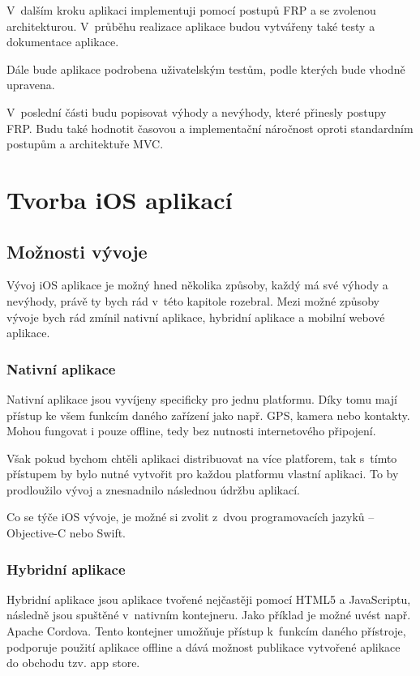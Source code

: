 \documentclass[thesis=M,czech]{FITthesis}[2012/06/26]
\begin{document}
V~dalším kroku aplikaci implementuji pomocí postupů FRP a se zvolenou architekturou. V~průběhu realizace aplikace budou vytvářeny také testy a dokumentace aplikace.

Dále bude aplikace podrobena uživatelským testům, podle kterých bude vhodně upravena.

V~poslední části budu popisovat výhody a nevýhody, které přinesly postupy FRP. Budu také hodnotit časovou a implementační náročnost oproti standardním postupům a architektuře MVC. 


\chapter{Tvorba iOS aplikací}

\section{Možnosti vývoje}
Vývoj iOS aplikace je možný hned několika způsoby, každý má své výhody a nevýhody, právě ty bych rád v~této kapitole rozebral. Mezi možné způsoby vývoje bych rád zmínil nativní aplikace, hybridní aplikace a mobilní webové aplikace.

\subsection{Nativní aplikace}
Nativní aplikace jsou vyvíjeny specificky pro jednu platformu. Díky tomu mají přístup ke všem funkcím daného zařízení jako např. GPS, kamera nebo kontakty. Mohou fungovat i pouze offline, tedy bez nutnosti internetového připojení. \cite{Nielsen}

Však pokud bychom chtěli aplikaci distribuovat na více platforem, tak s~tímto přístupem by bylo nutné vytvořit pro každou platformu vlastní aplikaci. To by prodloužilo vývoj a znesnadnilo následnou údržbu aplikací.

Co se týče iOS vývoje, je možné si zvolit z~dvou programovacích jazyků -- Objective-C nebo Swift. \cite{objc} \cite{swift}

\subsection{Hybridní aplikace}
Hybridní aplikace jsou aplikace tvořené nejčastěji pomocí HTML5 a JavaScriptu, následně jsou spuštěné v~nativním kontejneru. \cite{saleforce} Jako příklad je možné uvést např. Apache Cordova. Tento kontejner umožňuje přístup k~funkcím daného přístroje, podporuje použití aplikace offline a dává možnost publikace vytvořené aplikace do obchodu tzv. app store. \cite{cordova}
\end{document}
